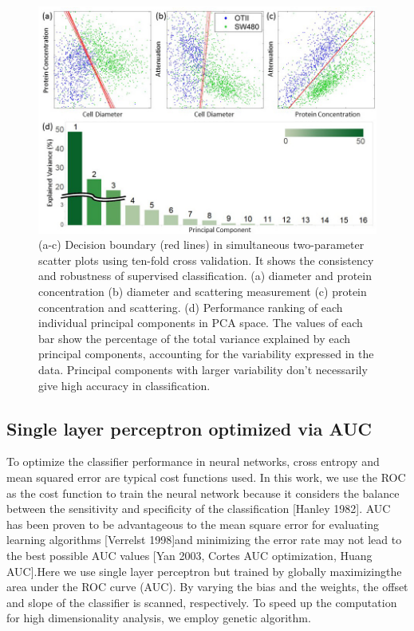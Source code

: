 \documentclass[aps,pra,reprint,superscriptaddress]{revtex4-1}
\begin{document}
\begin{figure}
\includegraphics[scale=0.55]{FigurePCA.jpg}
\caption{\label{fig:PCA} (a-c) Decision boundary (red lines) in simultaneous two-parameter scatter plots using ten-fold cross validation. It shows the consistency and robustness of supervised classification. (a) diameter and protein concentration (b) diameter and scattering measurement (c) protein concentration and scattering. (d) Performance ranking of each individual principal components in PCA space. The values of each bar show the percentage of the total variance explained by each principal components, accounting for the variability expressed in the data. Principal components with larger variability don’t necessarily give high accuracy in classification.}
\end{figure}

\subsection{Single layer perceptron optimized via AUC}

To optimize the classifier performance in neural networks, cross entropy and mean squared error are typical cost functions used. In this work, we use the ROC as the cost function to train the neural network because it considers the balance between the sensitivity and specificity of the classification [Hanley 1982]. AUC has been proven to be advantageous to the mean square error for evaluating learning algorithms [Verrelst 1998]and minimizing the error rate may not lead to the best possible AUC values [Yan 2003, Cortes AUC optimization, Huang AUC].Here we use single layer perceptron but trained by globally maximizingthe area under the ROC curve (AUC). By varying the bias and the weights, the offset and slope of the classifier is scanned, respectively. To speed up the computation for high dimensionality analysis, we employ genetic algorithm. 
\end{document}
